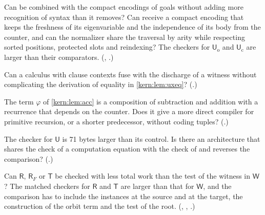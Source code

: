 \begin{question}
\label{kern:q:urcompact}
Can  be combined with the compact encodings of goals without
adding more recognition of syntax than it removes?  Can 
receive a compact encoding that keeps the freshness of its eigenvariable
and the independence of its body from the counter, and can the normalizer
share the traversal by arity while respecting sorted positions, protected
slots and reindexing?  The checkers for $\mathsf{U}_{\mathrm{o}}$ and
$\mathsf{U}_{\mathrm{c}}$ are larger than their comparators.
(, .)
\end{question}

\begin{question}
\label{kern:q:uxclauses}
Can a calculus with clause contexts fuse  with the discharge
of a witness without complicating the derivation of equality in
\cref{kern:lem:uxeq}?  (.)
\end{question}

\begin{question}
\label{kern:q:accumulator}
The term $\varphi$ of \cref{kern:lem:acc} is a composition of subtraction
and addition with a recurrence that depends on the counter.  Does it give a
more direct compiler for primitive recursion, or a shorter predecessor,
without coding tuples?  (.)
\end{question}

\begin{question}
\label{kern:q:ursize}
The checker for $\mathsf{U}$ is 71 bytes larger than its control.  Is there
an architecture that shares the check of a computation equation with the
check of  and reverses the comparison?
(.)
\end{question}

\begin{question}
\label{kern:q:mixedcost}
Can $\mathsf{R}$, $\mathsf{R}_{F}$ or $\mathsf{T}$ be checked with less
total work than the test of the witness in $\mathsf{W}$?  The matched
checkers for $\mathsf{R}$ and $\mathsf{T}$ are larger than that for
$\mathsf{W}$, and the comparison has to include the instances at the source
and at the target, the construction of the orbit term and the test of the
root.  (, ,
.)
\end{question}

